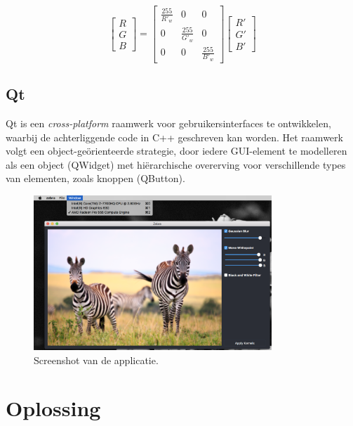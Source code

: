 \documentclass[twocolumn, a4paper]{article}
\begin{document}
\begin{equation}
\left[\begin{array}{c} R \\ G \\ B \end{array}\right]=\left[\begin{array}{ccc}\frac{255}{R'_w} & 0 & 0 \\ 0 & \frac{255}{G'_w} & 0 \\ 0 & 0 & \frac{255}{B'_w}\end{array}\right]\left[\begin{array}{c}R' \\ G' \\ B' \end{array}\right]
\end{equation}

\subsection{Qt}
Qt is een \emph{cross-platform} raamwerk voor gebruikersinterfaces te ontwikkelen, waarbij de achterliggende code in C++ geschreven kan worden. Het raamwerk volgt een object-geörienteerde strategie, door iedere GUI-element te modelleren als een object (QWidget) met hiërarchische overerving voor verschillende types van elementen, zoals knoppen (QButton).

\begin{figure}[htb]
    \centering
    \includegraphics[width=0.8\textwidth]{screenshot.png}
    \caption{Screenshot van de applicatie.}\label{fig:gui}
\end{figure}
\newpage

\section{Oplossing}
\end{document}

